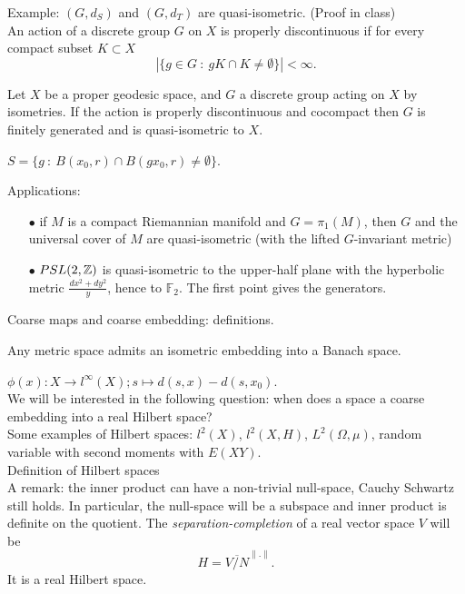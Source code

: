 Example: $(G,d_S)$ and $(G,d_T)$ are quasi-isometric. (Proof in class)\\

An action of a discrete group $G$ on $X$ is properly discontinuous if for every compact subset $K\subset X$
\[ | \{ g\in G  \ : \ gK \cap K \neq \emptyset \} | <\infty.\]

\begin{thm}
Let $X$ be a proper geodesic space, and $G$ a discrete group acting on $X$ by isometries. If the action is properly discontinuous and cocompact then $G$ is finitely generated and is quasi-isometric to $X$.
\end{thm} 

$S = \{ g \ : \ B(x_0, r)\cap B(gx_0,r)\neq \emptyset \}$.

Applications: 
\begin{itemize}
\item[$\bullet$] if $M$ is a compact Riemannian manifold and $G=\pi_1(M)$, then $G$ and the universal cover of $M$ are quasi-isometric (with the lifted $G$-invariant metric)
\item[$\bullet$] $PSL(2, \mathbb Z)$ is quasi-isometric to the upper-half plane with the hyperbolic metric $\frac{dx^2+dy^2}{y}$, hence to $\mathbb F_2$. The first point gives the generators.\\
\end{itemize}

Coarse maps and coarse embedding: definitions.\\

\begin{prop}
Any metric space admits an isometric embedding into a Banach space.
\end{prop}

$\phi(x) : X\rightarrow l^\infty (X) ;  s \mapsto d(s,x) - d(s,x_0)$.\\

We will be interested in the following question: when does a space a coarse embedding into a real Hilbert space?\\

Some examples of Hilbert spaces: $l^2(X)$, $l^2(X,H)$, $L^2(\Omega, \mu)$, random variable with second moments with $E(XY)$.\\

Definition of Hilbert spaces\\

A remark: the inner product can have a non-trivial null-space, Cauchy Schwartz still holds. In particular, the null-space will be a subspace and inner product is definite on the quotient. The \textit{separation-completion} of a real vector space $V$ will be 
\[H = \overline{V /N }^{\| .\|}.\]
It is a real Hilbert space.\\
 
